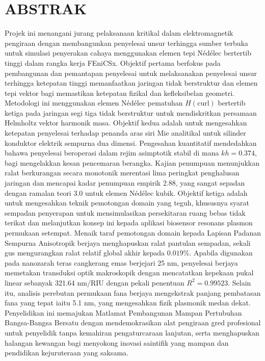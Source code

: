 \documentclass[12pt, a4paper]{report}
\begin{document}
\newpage
\chapter*{ABSTRAK}

\begin{doublespacing}
Projek ini menangani jurang pelaksanaan kritikal dalam elektromagnetik pengiraan dengan membangunkan penyelesai unsur terhingga sumber terbuka untuk simulasi penyerakan cahaya menggunakan elemen tepi N\'ed\'elec bertertib tinggi dalam rangka kerja FEniCSx. Objektif pertama berfokus pada pembangunan dan pemantapan penyelesai untuk melaksanakan penyelesai unsur terhingga ketepatan tinggi memanfaatkan jaringan tidak berstruktur dan elemen tepi vektor bagi memastikan ketepatan fizikal dan kefleksibelan geometri. Metodologi ini menggunakan elemen N\'ed\'elec pematuhan $H(\text{curl})$ bertertib ketiga pada jaringan segi tiga tidak berstruktur untuk mendiskritkan persamaan Helmholtz vektor harmonik masa. Objektif kedua adalah untuk mengesahkan ketepatan penyelesai terhadap penanda aras siri Mie analitikal untuk silinder konduktor elektrik sempurna dua dimensi. Pengesahan kuantitatif mendedahkan bahawa penyelesai beroperasi dalam rejim asimptotik stabil di mana $kh = 0.374$, bagi mengelakkan kesan pencemaran berangka. Kajian penumpuan menunjukkan ralat berkurangan secara monotonik merentasi lima peringkat penghalusan jaringan dan mencapai kadar penumpuan empirik 2.88, yang sangat sepadan dengan ramalan teori 3.0 untuk elemen N\'ed\'elec kubik. Objektif ketiga adalah untuk mengesahkan teknik pemotongan domain yang teguh, khususnya syarat sempadan penyerapan untuk mensimulasikan persekitaran ruang bebas tidak terikat dan melanjutkan konsep ini kepada aplikasi biosensor resonans plasmon permukaan setempat. Menaik taraf pemotongan domain kepada Lapisan Padanan Sempurna Anisotropik berjaya menghapuskan ralat pantulan sempadan, sekali gus mengurangkan ralat relatif global akhir kepada $0.019\%$. Apabila digunakan pada nanozarah teras cangkerang emas berjejari 25 nm, penyelesai berjaya memetakan transduksi optik makroskopik dengan mencatatkan kepekaan pukal linear sebanyak 321.64 nm/RIU dengan pekali penentuan $R^2 = 0.99523$. Selain itu, analisis perebutan permukaan fana berjaya mengekstrak panjang pembatasan fana yang tepat iaitu 5.1 nm, yang mengesahkan fizik plasmonik medan dekat. Penyelidikan ini memajukan Matlamat Pembangunan Mampan Pertubuhan Bangsa-Bangsa Bersatu dengan mendemokrasikan alat pengiraan gred profesional untuk penyelidik tanpa kemahiran pengaturcaraan lanjutan, serta menghapuskan halangan kewangan bagi menyokong inovasi saintifik yang mampan dan pendidikan kejuruteraan yang saksama.
\end{doublespacing}
\end{document}
